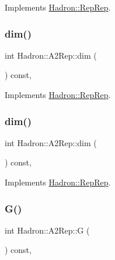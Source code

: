 Implements \mbox{\hyperlink{structHadron_1_1RepRep_a92c8802e5ed7afd7da43ccfd5b7cd92b}{Hadron\+::\+Rep\+Rep}}.

\mbox{\label{structHadron_1_1A2Rep_a17b15564f35f6be6afa4a189806da16b}} 
\subsubsection{\texorpdfstring{dim()}{dim()}\hspace{0.1cm}{\footnotesize\ttfamily [4/5]}}
{\footnotesize\ttfamily int Hadron\+::\+A2\+Rep\+::dim (\begin{DoxyParamCaption}{ }\end{DoxyParamCaption}) const\hspace{0.3cm}{\ttfamily [inline]}, {\ttfamily [virtual]}}



Implements \mbox{\hyperlink{structHadron_1_1RepRep_a92c8802e5ed7afd7da43ccfd5b7cd92b}{Hadron\+::\+Rep\+Rep}}.

\mbox{\label{structHadron_1_1A2Rep_a17b15564f35f6be6afa4a189806da16b}} 
\subsubsection{\texorpdfstring{dim()}{dim()}\hspace{0.1cm}{\footnotesize\ttfamily [5/5]}}
{\footnotesize\ttfamily int Hadron\+::\+A2\+Rep\+::dim (\begin{DoxyParamCaption}{ }\end{DoxyParamCaption}) const\hspace{0.3cm}{\ttfamily [inline]}, {\ttfamily [virtual]}}



Implements \mbox{\hyperlink{structHadron_1_1RepRep_a92c8802e5ed7afd7da43ccfd5b7cd92b}{Hadron\+::\+Rep\+Rep}}.

\mbox{\label{structHadron_1_1A2Rep_a6c2da481eeb98634c640e8f17a569eea}} 
\subsubsection{\texorpdfstring{G()}{G()}\hspace{0.1cm}{\footnotesize\ttfamily [1/3]}}
{\footnotesize\ttfamily int Hadron\+::\+A2\+Rep\+::G (\begin{DoxyParamCaption}{ }\end{DoxyParamCaption}) const\hspace{0.3cm}{\ttfamily [inline]}, {\ttfamily [virtual]}}

